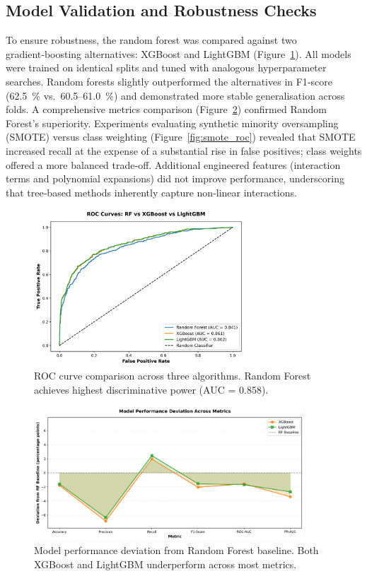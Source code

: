 \documentclass[12pt]{article}
\begin{document}
\subsection{Model Validation and Robustness Checks}
To ensure robustness, the random forest was compared against two gradient‑boosting alternatives: XGBoost and LightGBM (Figure~\ref{fig:model_comparison}).  All models were trained on identical splits and tuned with analogous hyperparameter searches.  Random forests slightly outperformed the alternatives in F1‑score (62.5~\% vs.\ 60.5–61.0~\%) and demonstrated more stable generalisation across folds.  A comprehensive metrics comparison (Figure~\ref{fig:metrics_comparison}) confirmed Random Forest's superiority.  Experiments evaluating synthetic minority oversampling (SMOTE) versus class weighting (Figure~\ref{fig:smote_roc}) revealed that SMOTE increased recall at the expense of a substantial rise in false positives; class weights offered a more balanced trade‑off.  Additional engineered features (interaction terms and polynomial expansions) did not improve performance, underscoring that tree‑based methods inherently capture non‑linear interactions.

\begin{figure}[H]
\centering
\includegraphics[width=0.7\textwidth]{../img/21_model_comparison_roc.png}
\caption{ROC curve comparison across three algorithms. Random Forest achieves highest discriminative power (AUC = 0.858).}
\label{fig:model_comparison}
\end{figure}

\begin{figure}[H]
\centering
\includegraphics[width=0.9\textwidth]{../img/24_model_comparison_metrics.png}
\caption{Model performance deviation from Random Forest baseline. Both XGBoost and LightGBM underperform across most metrics.}
\label{fig:metrics_comparison}
\end{figure}
\end{document}
